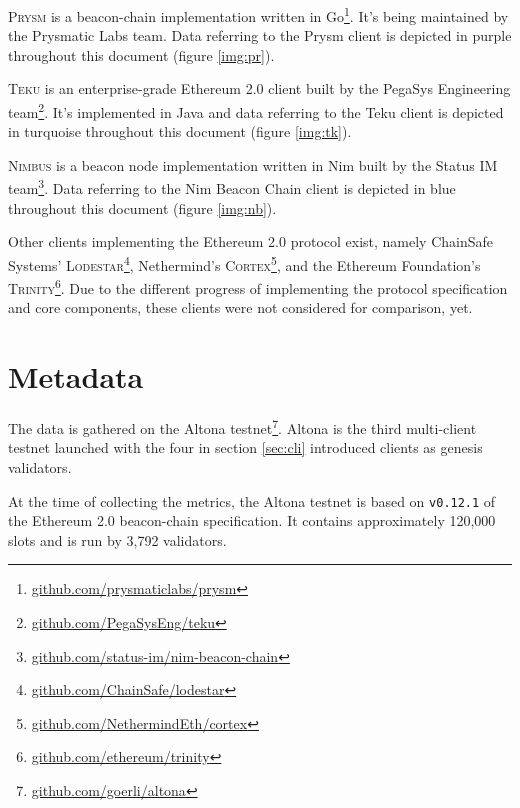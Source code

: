 \documentclass[twoside,twocolumn]{article}
\begin{document}
\textsc{Prysm} is a beacon-chain implementation written in Go\footnote{\href{https://github.com/prysmaticlabs/prysm}{github.com/prysmaticlabs/prysm}}. It's being maintained by the Prysmatic Labs team. Data referring to the Prysm client is depicted in purple throughout this document (figure \ref{img:pr}).\par

\textsc{Teku} is an enterprise-grade Ethereum 2.0 client built by the PegaSys Engineering team\footnote{\href{https://github.com/PegaSysEng/teku}{github.com/PegaSysEng/teku}}. It's implemented in Java and data referring to the Teku client is depicted in turquoise throughout this document (figure \ref{img:tk}).\par

\textsc{Nimbus} is a beacon node implementation written in Nim built by the Status IM team\footnote{\href{https://github.com/status-im/nim-beacon-chain}{github.com/status-im/nim-beacon-chain}}. Data referring to the Nim Beacon Chain client is depicted in blue throughout this document (figure \ref{img:nb}).\par

Other clients implementing the Ethereum 2.0 protocol exist, namely ChainSafe Systems' \textsc{Lodestar}\footnote{\href{https://github.com/ChainSafe/lodestar}{github.com/ChainSafe/lodestar}}, Nethermind's \textsc{Cortex}\footnote{\href{https://github.com/NethermindEth/cortex}{github.com/NethermindEth/cortex}}, and the Ethereum Foundation's \textsc{Trinity}\footnote{\href{https://github.com/ethereum/trinity}{github.com/ethereum/trinity}}. Due to the different progress of implementing the protocol specification and core components, these clients were not considered for comparison, yet.\par

\section{Metadata}
The data is gathered on the Altona testnet\footnote{\href{https://github.com/goerli/altona}{github.com/goerli/altona}}. Altona is the third multi-client testnet launched with the four in section \ref{sec:cli} introduced clients as genesis validators.\par

At the time of collecting the metrics, the Altona testnet is based on \texttt{v0.12.1} of the Ethereum 2.0 beacon-chain specification. It contains approximately 120,000 slots and is run by 3,792 validators.\par
\end{document}

